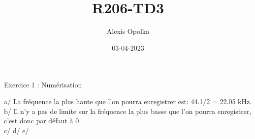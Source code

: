 \documentclass{article}
\title{R206-TD3}
\date{03-04-2023}
\author{Alexis Opolka}
\begin{document}
  \maketitle
  \newpage
  Exercice 1 : Numérisation

  a/ La fréquence la plus haute que l'on pourra enregistrer est: 44.1/2 = 22.05 kHz. \\
  b/ Il n'y a pas de limite sur la fréquence la plus basse que l'on pourra enregistrer, c'est donc par défaut à 0. \\
  c/ 
  d/
  e/
\end{document}
